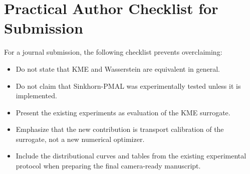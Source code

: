 \documentclass[10pt,journal]{IEEEtran}
\begin{document}
\section{Practical Author Checklist for Submission}
\label{app:checklist}

For a journal submission, the following checklist prevents overclaiming:
\begin{itemize}[leftmargin=1.1em]
    \item Do not state that KME and Wasserstein are equivalent in general.
    \item Do not claim that Sinkhorn-PMAL was experimentally tested unless it is implemented.
    \item Present the existing experiments as evaluation of the KME surrogate.
    \item Emphasize that the new contribution is transport calibration of the surrogate, not a new numerical optimizer.
    \item Include the distributional curves and tables from the existing experimental protocol when preparing the final camera-ready manuscript.
\end{itemize}
\end{document}
